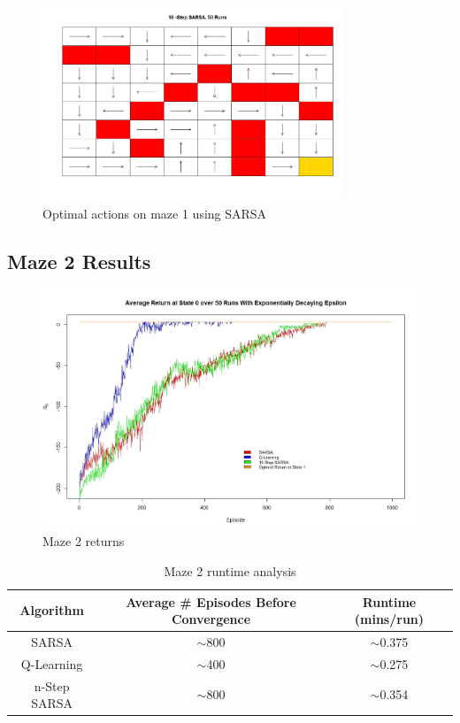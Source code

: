 \documentclass[final,12pt,3p]{elsarticle}
\begin{document}
\begin{figure}[H]
    \centering
    \caption{Optimal actions on maze 1 using SARSA}
    \includegraphics[width=9cm]{figures/Maps/Maze1/10StepSARSAMapMaze1.jpeg}
\end{figure}

\subsection{Maze 2 Results}

\begin{figure}[H]
    \centering
    \caption{Maze 2 returns}
    \includegraphics[width=13cm]{figures/Maze2.jpeg}
\end{figure}

\begin{table}[H]
    \centering
    \caption{Maze 2 runtime analysis}
    \begin{tabular}{|c|c|c|}
        \hline
        \textbf{Algorithm} & \textbf{Average \# Episodes Before Convergence} & \textbf{Runtime (mins/run)} \\ \hline
        SARSA & $\sim$800 & $\sim$0.375 \\ \hline
        Q-Learning & $\sim$400 & $\sim$0.275 \\ \hline
        n-Step SARSA & $\sim$800 & $\sim$0.354 \\ \hline
    \end{tabular}
\end{table}
\end{document}
